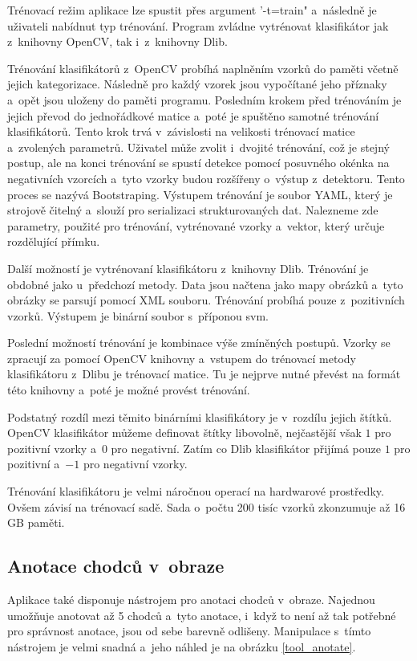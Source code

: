 Trénovací režim aplikace lze spustit přes argument '-t=train" a~následně je uživateli nabídnut typ trénování. Program zvládne vytrénovat klasifikátor jak z~knihovny OpenCV, tak i~z~knihovny Dlib. 

Trénování klasifikátorů z~OpenCV probíhá naplněním vzorků do paměti včetně jejich kategorizace. Následně pro každý vzorek jsou vypočítané jeho příznaky a~opět jsou uloženy do paměti programu. Posledním krokem před trénováním je jejich převod do jednořádkové matice a~poté je spuštěno samotné trénování klasifikátorů. Tento krok trvá v~závislosti na velikosti trénovací matice a~zvolených parametrů. Uživatel může zvolit i~dvojité trénování, což je stejný postup, ale na konci trénování se spustí detekce pomocí posuvného okénka na negativních vzorcích a~tyto vzorky budou rozšířeny o~výstup z~detektoru. Tento proces se nazývá Bootstraping. Výstupem trénování je soubor YAML, který je strojově čitelný a~slouží pro serializaci strukturovaných dat. Nalezneme zde parametry, použité pro trénování, vytrénované vzorky a~vektor, který určuje rozdělující přímku.

Další možností je vytrénovaní klasifikátoru z~knihovny Dlib. Trénování je obdobné jako u~předchozí metody. Data jsou načtena jako mapy obrázků a~tyto obrázky se parsují pomocí XML souboru. Trénování probíhá pouze z~pozitivních vzorků. Výstupem je binární soubor s~příponou svm.

Poslední možností trénování je kombinace výše zmíněných postupů. Vzorky se zpracují za pomocí OpenCV knihovny a~vstupem do trénovací metody klasifikátoru z~Dlibu je trénovací matice. Tu je nejprve nutné převést na formát této knihovny a~poté je možné provést trénování.

Podstatný rozdíl mezi těmito binárními klasifikátory je v~rozdílu jejich štítků. OpenCV klasifikátor můžeme definovat štítky libovolně, nejčastější však $1$ pro pozitivní vzorky a~$0$ pro negativní. Zatím co Dlib klasifikátor přijímá pouze $1$ pro pozitivní a~$-1$ pro negativní vzorky.

Trénování klasifikátoru je velmi náročnou  operací na hardwarové prostředky. Ovšem závisí na trénovací sadě. Sada o~počtu 200 tisíc vzorků zkonzumuje až 16 GB paměti.

\subsection{Anotace chodců v~obraze}
Aplikace také disponuje nástrojem pro anotaci chodců v~obraze. Najednou umožňuje anotovat až 5 chodců a~tyto anotace, i~když to není až tak potřebné pro správnost anotace, jsou od sebe barevně odlišeny. Manipulace s~tímto nástrojem je velmi snadná a~jeho náhled je na obrázku \ref{tool_anotate}.

